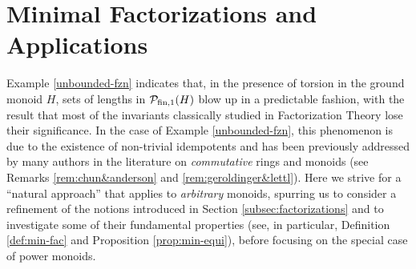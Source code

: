 \chapter{Minimal Factorizations and Applications} \label{ch:minimal factorizations}

Example \ref{unbounded-fzn} indicates that, in the presence of torsion in the ground monoid $H$, sets of lengths in $\mathcal{P}_{\textrm{fin}, 1}(H)$ blow up in a predictable fashion, with the result that most of the invariants classically studied in Factorization Theory lose their significance. 
In the case of Example \ref{unbounded-fzn}, this phenomenon is due to the existence of non-trivial idempotents and has been previously addressed by many authors in the literature on \emph{commutative} rings and monoids (see Remarks \ref{rem:chun&anderson} and \ref{rem:geroldinger&lettl}).
Here we strive for a ``natural approach'' that applies to \emph{arbitrary} monoids, spurring us to consider a refinement of the notions introduced in Section \ref{subsec:factorizations} and to investigate some of their fundamental properties (see, in particular, Definition \ref{def:min-fac} and Proposition \ref{prop:min-equi}), before focusing on the special case of power monoids.

